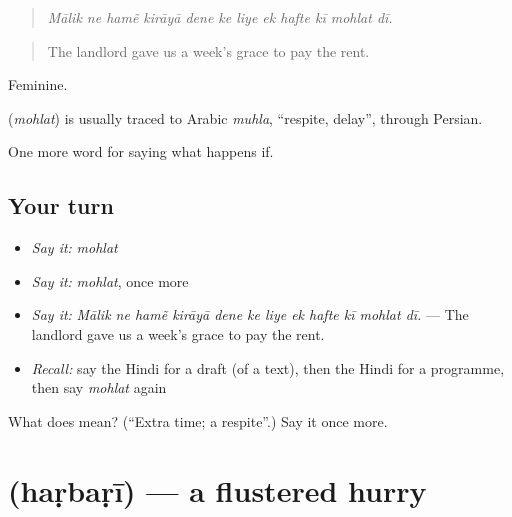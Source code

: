 \begin{quote}
           
\end{quote}

\begin{quote}
\emph{Mālik ne hamẽ kirāyā dene ke liye ek hafte kī mohlat dī.}
\end{quote}

\begin{quote}
The landlord gave us a week's grace to pay the rent.
\end{quote}

Feminine.

\begin{cousinweb}
\textbf{} (\emph{mohlat}) is usually traced to Arabic \emph{muhla}, \textquotedblleft{}respite, delay\textquotedblright{}, through Persian.
\end{cousinweb}

\begin{grammarlens}[title={What you've built}]
One more word for saying what happens if.
\end{grammarlens}

\subsection*{Your turn}
\begin{itemize}
\raggedright
  \item \emph{Say it:} \emph{mohlat}
  \item \emph{Say it:} \emph{mohlat}, once more
  \item \emph{Say it:} \emph{Mālik ne hamẽ kirāyā dene ke liye ek hafte kī mohlat dī.} — The landlord gave us a week's grace to pay the rent.
  \item \emph{Recall:} say the Hindi for a draft (of a text), then the Hindi for a programme, then say \emph{mohlat} again
\end{itemize}

\begin{tcolorbox}[breakable,colback=teal!4,colframe=teal!35!black,title={Before you move on}]
What does  mean? (\textquotedblleft{}Extra time; a respite\textquotedblright{}.) Say it once more.
\end{tcolorbox}
\section[\texorpdfstring{\hi{हड़बड़ी} (haṛbaṛī)}{हड़बड़ी (haṛbaṛī)}]{ (haṛbaṛī) — a flustered hurry}

